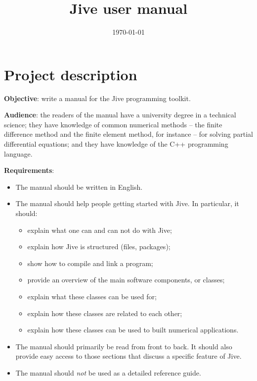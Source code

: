 \documentclass[a4paper,12pt]{article}
\title{ Jive user manual }
\author{ }
\date{\today }
\newcommand{\BlankLine}{\vspace{1.5ex} \noindent}
\begin{document}
\maketitle



\section{Project description}

\textbf{Objective}: write a manual for the Jive programming toolkit.

\BlankLine
\textbf{Audience}: the readers of the manual have a university degree
in a technical science; they have knowledge of common numerical
methods -- the finite difference method and the finite element method,
for instance -- for solving partial differential equations; and they have
knowledge of the C++ programming language.

\BlankLine
\textbf{Requirements}:
\begin{itemize}

\item The manual should be written in English.

\item The manual should help people getting started with Jive. In
  particular, it should:

  \begin{itemize}

  \item explain what one can and can not do with Jive;

  \item explain how Jive is structured (files, packages);

  \item show how to compile and link a program; 

  \item provide an overview of the main software components, or classes;

  \item explain what these classes can be used for;

  \item explain how these classes are related to each other;
    
  \item explain how these classes can be used to built numerical
    applications.
    
  \end{itemize}
  
\item The manual should primarily be read from front to back. It
  should also provide easy access to those sections that discuss a
  specific feature of Jive.
  
\item The manual should \emph{not} be used as a detailed reference
  guide.

\end{itemize}
\end{document}
